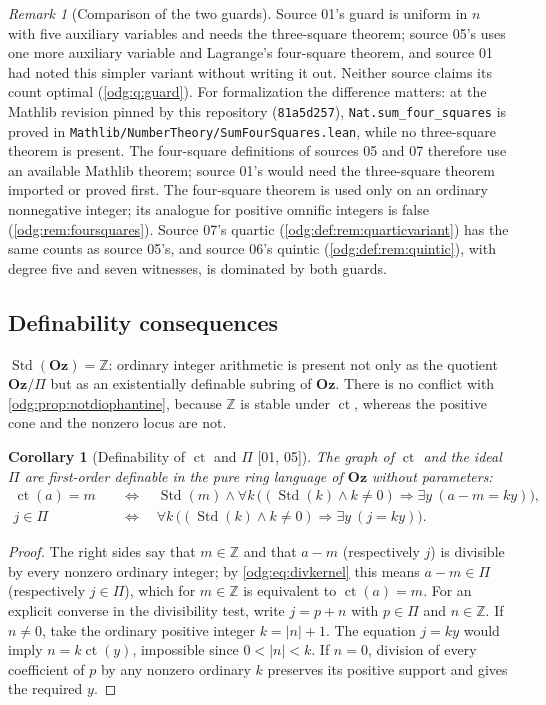 \documentclass[11pt,oneside]{article}
\numberwithin{equation}{section}
\newtheorem{corollary}[corollary]{Corollary}
\theoremstyle{definition}
\theoremstyle{remark}
\newtheorem{remark}[remark]{Remark}
\newcommand{\Oz}{\mathbf{Oz}}
\newcommand{\Z}{\mathbb Z}
\newcommand{\ct}{\operatorname{ct}}
\newcommand{\Std}{\operatorname{Std}}
\newcommand{\src}[1]{\textup{\textsf{\small[#1]}}}
\newcommand{\fn}[1]{\nolinkurl{#1}}
\begin{document}
\begin{remark}[Comparison of the two guards]\label{odg:rem:guards}
Source 01's guard is uniform in $n$ with five auxiliary variables and needs
the three-square theorem; source 05's uses one more auxiliary variable and
Lagrange's four-square theorem, and source 01 had noted this simpler variant
without writing it out. Neither source claims its count optimal
(\cref{odg:q:guard}). For formalization the difference matters: at the
Mathlib revision pinned by this repository (\texttt{81a5d257}),
\fn{Nat.sum_four_squares} is proved in
\fn{Mathlib/NumberTheory/SumFourSquares.lean}, while no three-square
theorem is present. The four-square definitions of sources 05 and 07
therefore use an available Mathlib theorem; source 01's would need the three-square theorem imported or
proved first. The four-square theorem is used only on an ordinary
nonnegative integer; its analogue for positive omnific integers is false
(\cref{odg:rem:foursquares}). Source 07's quartic
(\cref{odg:def:rem:quarticvariant}) has the same counts as source 05's, and
source 06's quintic (\cref{odg:def:rem:quintic}), with degree five and seven
witnesses, is dominated by both guards.
\end{remark}

\subsection{Definability consequences}

$\Std(\Oz)=\Z$: ordinary integer arithmetic is present not only as the
quotient $\Oz/\Pi$ but as an existentially definable subring of $\Oz$.
There is no conflict with \cref{odg:prop:notdiophantine}, because $\Z$ is
stable under $\ct$, whereas the positive cone and the nonzero locus are not.

\begin{corollary}[Definability of $\ct$ and $\Pi$ \src{01, 05}]\label{odg:cor:definablect}\label{odg:cor:Jdefinable}
The graph of $\ct$ and the ideal $\Pi$ are first-order definable in the pure
ring language of $\Oz$ without parameters:
\begin{align*}
 \ct(a)=m\quad&\Longleftrightarrow\quad
 \Std(m)\land\forall k\,\bigl((\Std(k)\land k\ne0)\Rightarrow
 \exists y\ (a-m=ky)\bigr),\\
 j\in\Pi\quad&\Longleftrightarrow\quad
 \forall k\,\bigl((\Std(k)\land k\ne0)\Rightarrow\exists y\ (j=ky)\bigr).
\end{align*}
\end{corollary}
\begin{proof}
The right sides say that $m\in\Z$ and that $a-m$ (respectively $j$) is
divisible by every nonzero ordinary integer; by \eqref{odg:eq:divkernel}
this means $a-m\in\Pi$ (respectively $j\in\Pi$), which for $m\in\Z$ is
equivalent to $\ct(a)=m$.
For an explicit converse in the divisibility test, write $j=p+n$ with
$p\in\Pi$ and $n\in\Z$. If $n\ne0$, take the ordinary positive integer
$k=|n|+1$. The equation $j=ky$ would imply $n=k\ct(y)$, impossible since
$0<|n|<k$. If $n=0$, division of every coefficient of $p$ by any nonzero
ordinary $k$ preserves its positive support and gives the required $y$.
\end{proof}
\end{document}
